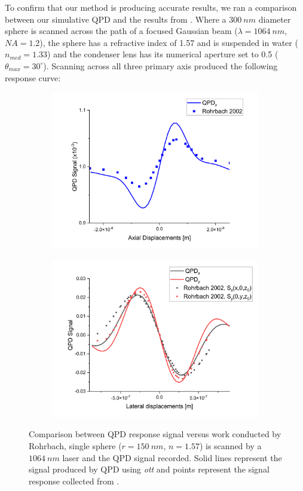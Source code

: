 To confirm that our method is producing accurate results, we ran a 
comparison between our simulative QPD and the results from \cite{Rohrbach2002}. Where a $300\ nm$ diameter sphere is scanned 
across the path of a focused Gaussian beam ($\lambda=1064\ nm$, $NA=1.2$), the sphere has a refractive index of 1.57 and is suspended in water ($n_{med}=1.33$) and the condenser lens has its numerical aperture
set to 0.5 ($\theta_{max} = 30^\circ$). Scanning across all three primary axis produced the following response curve:
\begin{figure}[h!]
	\begin{subfigure}{0.475 \linewidth}
		\subcaption{}
		\includegraphics[width=\linewidth]{QPD_axial_tests.png}
	\end{subfigure}
	\begin{subfigure}{0.475 \linewidth}
		\subcaption{}
		\includegraphics[width=\linewidth]{QPD_lat_tests.png}
	\end{subfigure}
	\caption{Comparison between QPD response signal versus work conducted by 
		Rohrbach, single sphere ($r = 150\ nm$, $n=1.57$) is scanned by a $1064\ nm$ laser and the QPD signal recorded. Solid lines represent the signal produced by QPD using \textit{ott} and points represent the signal response collected from \cite{Rohrbach2002}.}
	\label{fig:Rohrbach}
\end{figure}

